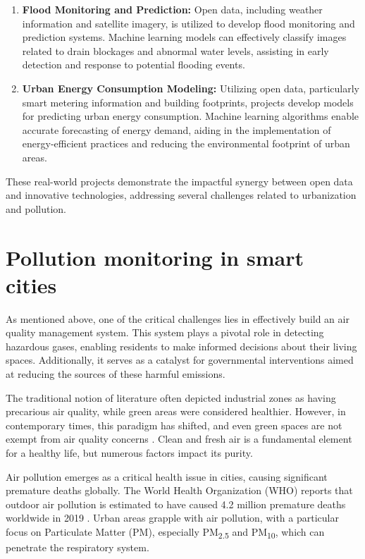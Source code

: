 \begin{enumerate}
\item \textbf{Flood Monitoring and Prediction:}
   Open data, including weather information and satellite imagery, is utilized to develop flood monitoring and prediction systems. Machine learning models can effectively classify images related to drain blockages and abnormal water levels, assisting in early detection and response to potential flooding events.

\item \textbf{Urban Energy Consumption Modeling:}
   Utilizing open data, particularly smart metering information and building footprints, projects develop models for predicting urban energy consumption. Machine learning algorithms enable accurate forecasting of energy demand, aiding in the implementation of energy-efficient practices and reducing the environmental footprint of urban areas.
\end{enumerate}

These real-world projects demonstrate the impactful synergy between open data and innovative technologies, addressing several challenges related to urbanization and pollution.

\section{Pollution monitoring in smart cities}

As mentioned above, one of the critical challenges lies in effectively build an air quality management system. This system plays a pivotal role in detecting hazardous gases, enabling residents to make informed decisions about their living spaces. Additionally, it serves as a catalyst for governmental interventions aimed at reducing the sources of these harmful emissions.

The traditional notion of literature often depicted industrial zones as having precarious air quality, while green areas were considered healthier. However, in contemporary times, this paradigm has shifted, and even green spaces are not exempt from air quality concerns \cite{rhaiemair}. Clean and fresh air is a fundamental element for a healthy life, but numerous factors impact its purity.

Air pollution emerges as a critical health issue in cities, causing significant premature deaths globally. The World Health Organization (WHO) reports that outdoor air pollution is estimated to have caused 4.2 million premature deaths worldwide in 2019 \cite{WHO2018AirPollution}. Urban areas grapple with air pollution, with a particular focus on Particulate Matter (PM), especially PM\textsubscript{2.5} and PM\textsubscript{10}, which can penetrate the respiratory system.

